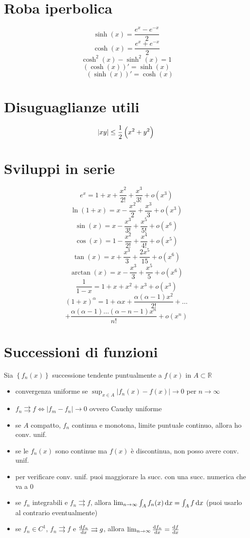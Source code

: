 \documentclass[a4paper,portrait,columns=3,5pt]{cheatsheet}
\begin{document}
\section{Roba iperbolica}
$$ \sinh(x) = \frac{e^x - e^{-x}}{2} $$
$$\cosh(x) = \frac{e^x + e^{-x}}{2}$$
$$ \cosh^2(x) - \sinh^2(x) = 1 $$
$$ (\cosh(x))' = \sinh(x)$$
$$ \quad (\sinh(x))' = \cosh(x) $$

\section{Disuguaglianze utili}
$$ \abs{xy} \leq \frac{1}{2}\left(x^2 + y^2\right) $$

\section{Sviluppi in serie}
$$ e^x = 1 + x + \frac{x^2}{2!} + \frac{x^3}{3!} + o(x^3)$$
$$ \ln(1 + x) = x - \frac{x^2}{2} + \frac{x^3}{3} + o(x^3)$$
$$ \sin(x) = x - \frac{x^3}{3!} + \frac{x^5}{5!} + o(x^6)$$
$$ \cos(x) = 1 - \frac{x^2}{2!} + \frac{x^4}{4!} + o(x^5)$$
$$ \tan(x) = x + \frac{x^3}{3} + \frac{2x^5}{15} + o(x^6)$$
$$ \arctan(x) = x - \frac{x^3}{3} + \frac{x^5}{5} + o(x^6)$$
$$ \frac{1}{1-x} = 1 + x + x^2 + x^3 + o(x^3)$$
$$(1 + x) ^ \alpha = 1 + \alpha x + \frac{\alpha (\alpha - 1)x^2}{2!} + \dots $$
$$ + \frac{\alpha(\alpha - 1)\dots (\alpha - n - 1) x^n}{n!} + o(x^n) $$

\section{Successioni di funzioni}
Sia $\left\{ f_n(x)\right\}$ successione tendente puntualmente a $f(x)$ in $A\subset \mathbb{R}$
\begin{itemize}
    \item convergenza uniforme se $\sup_{x\in A}\left|f_n(x) - f(x)\right| \rightarrow 0$ per $n\rightarrow \infty$
    \item $f_n\rightrightarrows f \Leftrightarrow \left| f_m - f_n \right| \rightarrow 0$ ovvero Cauchy uniforme
    \item se $A$ compatto, $f_n$ continua e monotona, limite puntuale continuo, allora ho conv. unif.
    \item se le $f_n(x)$ sono continue ma $f(x)$ è discontinua, non posso avere conv. unif. 
    \item per verificare conv. unif. puoi maggiorare la succ. con una succ. numerica che va a 0
    \item se $f_n$ integrabili e $f_n\rightrightarrows f$, allora $\lim_{n\rightarrow \infty} \int_A f_n(x) \dif x = \int_A f \dif x$ (puoi usarlo al contrario eventualmente)
    \item se $f_n \in C^1$, $f_n\rightrightarrows f$ e $\frac{\dif f_n}{\dif x} \rightrightarrows g$, allora $\lim_{n\rightarrow \infty} \frac{\dif f_n}{\dif x} = \frac{\dif f}{\dif x}$ 
\end{itemize}
\end{document}
